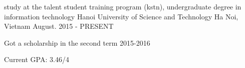 


\begin{cventries}


\cventry
{study at the talent student training program (kstn),
undergraduate degree in information technology} %
{Hanoi University of Science and Technology} %
{Ha Noi, Vietnam} %
{August. 2015 - PRESENT} %
{ %
\begin{cvitems}
\item {Got a scholarship in the second term 2015-2016}
\item {Current GPA: 3.46/4}
\end{cvitems}
}


\end{cventries}
